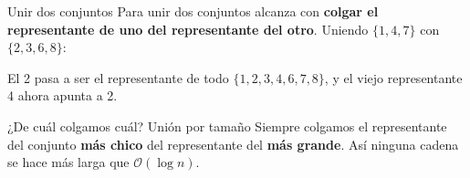 \documentclass{beamer}
\begin{document}
\begin{frame}{Unir dos conjuntos}
    Para unir dos conjuntos alcanza con \textbf{colgar el representante de uno
    del representante del otro}. Uniendo $\{1,4,7\}$ con $\{2,3,6,8\}$:

    \vspace{0.1cm}
    \begin{center}
    \end{center}

    \vspace{0.1cm}
    El 2 pasa a ser el representante de todo $\{1,2,3,4,6,7,8\}$, y el viejo
    representante 4 ahora apunta a 2.

    \vspace{0.2cm}
    \begin{block}{¿De cuál colgamos cuál? Unión por tamaño}
        Siempre colgamos el representante del conjunto \textbf{más chico} del
        representante del \textbf{más grande}. Así ninguna cadena se hace más
        larga que $\mathcal{O}(\log n)$.
    \end{block}
\end{frame}
\end{document}
